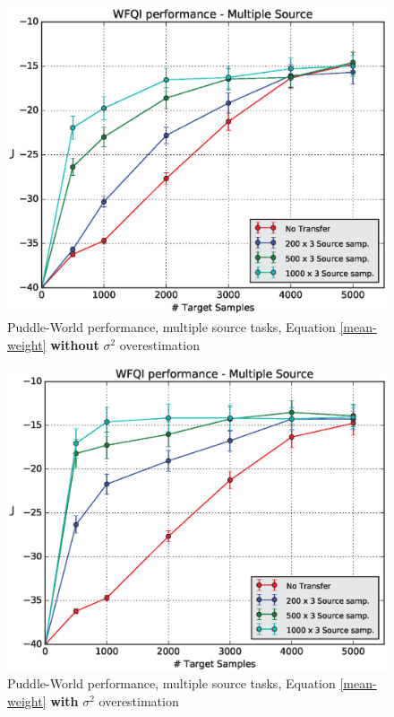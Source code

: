     \begin{figure}[H]
      \centering
      \includegraphics[scale=0.5]{images/WFQIPerfM_V2_MEAN.eps}
      \caption{Puddle-World performance, multiple source tasks, Equation \ref{mean-weight} \textbf{without} $\sigma^{2}$ overestimation}
      \label{mean-res1}
    \end{figure}

    \begin{figure}[H]
      \centering
      \includegraphics[scale=0.5]{images/WFQIPerfM_V2_MEAN2.eps}
      \caption{Puddle-World performance, multiple source tasks, Equation \ref{mean-weight} \textbf{with} $\sigma^{2}$ overestimation}
      \label{mean-res2}
    \end{figure}


